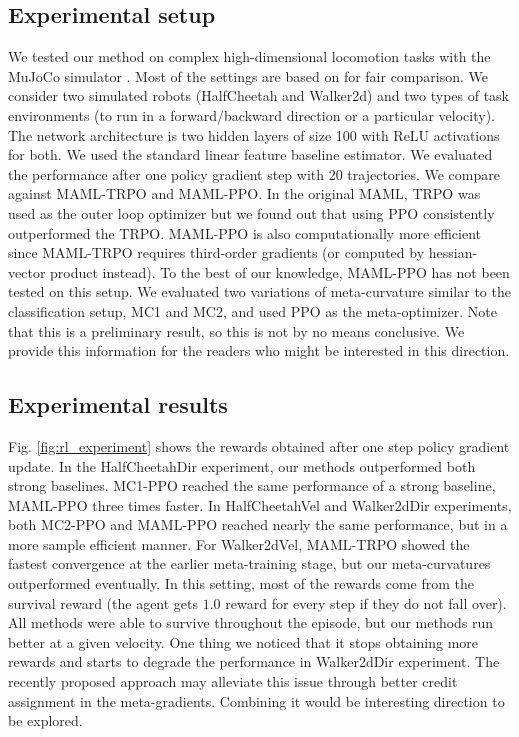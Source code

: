 \documentclass{article}
\begin{document}
\subsection{Experimental setup}
We tested our method on complex high-dimensional locomotion tasks with the MuJoCo simulator \cite{mujoco}. Most of the settings are based on \cite{Finn-icml-2017} for fair comparison. We consider two simulated robots (HalfCheetah and Walker2d) and two types of task environments (to run in a forward/backward direction or a particular velocity). The network architecture is two hidden layers of size 100 with ReLU activations for both. We used the standard linear feature baseline estimator. We evaluated the performance after one policy gradient step with 20 trajectories. We compare against MAML-TRPO and MAML-PPO. In the original MAML, TRPO \cite{trpo} was used as the outer loop optimizer but we found out that using PPO \cite{ppo} consistently outperformed the TRPO. MAML-PPO is also computationally more efficient since MAML-TRPO requires third-order gradients (or computed by hessian-vector product instead). To the best of our knowledge, MAML-PPO has not been tested on this setup. We evaluated two variations of meta-curvature similar to the classification setup, MC1 and MC2, and used PPO as the meta-optimizer. Note that this is a preliminary result, so this is not by no means conclusive. We provide this information for the readers who might be interested in this direction.

\subsection{Experimental results}
Fig. \ref{fig:rl_experiment} shows the rewards obtained after one step policy gradient update. In the HalfCheetahDir experiment, our methods outperformed both strong baselines. MC1-PPO reached the same performance of a strong baseline, MAML-PPO three times faster. In HalfCheetahVel and Walker2dDir experiments, both MC2-PPO and MAML-PPO reached nearly the same performance, but in a more sample efficient manner. For Walker2dVel, MAML-TRPO showed the fastest convergence at the earlier meta-training stage, but our meta-curvatures outperformed eventually. In this setting, most of the rewards come from the survival reward (the agent gets $1.0$ reward for every step if they do not fall over). All methods were able to survive throughout the episode, but our methods run better at a given velocity. One thing we noticed that it stops obtaining more rewards and starts to degrade the performance in Walker2dDir experiment. The recently proposed approach \cite{promp} may alleviate this issue through better credit assignment in the meta-gradients. Combining it would be interesting direction to be explored.
\end{document}
